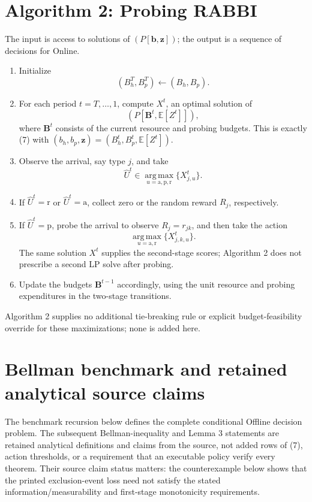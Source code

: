 \documentclass{article}
\begin{document}
\section*{Algorithm 2: Probing RABBI}
The input is access to solutions of $(P[\mathbf b,\mathbf z])$; the output is a sequence of decisions for Online.
\begin{enumerate}
\item Initialize
\[
(B_h^T,B_p^T)\leftarrow(B_h,B_p).
\]
\item For each period $t=T,\ldots,1$, compute $X^t$, an optimal solution of
\[
(P[\mathbf B^t,\mathbb E[Z^t]]),
\]
where $\mathbf B^t$ consists of the current resource and probing budgets. This is exactly (7) with $(b_h,b_p,\mathbf z)=(B_h^t,B_p^t,\mathbb E[Z^t])$.
\item Observe the arrival, say type $j$, and take
\[
\hat U^t\in\operatorname*{arg\,max}_{u=\mathrm a,\mathrm p,\mathrm r}
\{X^t_{j,u}\}.
\]
\item If $\hat U^t=\mathrm r$ or $\hat U^t=\mathrm a$, collect zero or the random reward $R_j$, respectively.
\item If $\hat U^t=\mathrm p$, probe the arrival to observe $R_j=r_{jk}$, and then take the action
\[
\operatorname*{arg\,max}_{u=\mathrm a,\mathrm r}\{X^t_{j,k,u}\}.
\]
The same solution $X^t$ supplies the second-stage scores; Algorithm 2 does not prescribe a second LP solve after probing.
\item Update the budgets $\mathbf B^{t-1}$ accordingly, using the unit resource and probing expenditures in the two-stage transitions.
\end{enumerate}
Algorithm 2 supplies no additional tie-breaking rule or explicit budget-feasibility override for these maximizations; none is added here.

\section*{Bellman benchmark and retained analytical source claims}
The benchmark recursion below defines the complete conditional Offline decision problem. The subsequent Bellman-inequality and Lemma 3 statements are retained analytical definitions and claims from the source, not added rows of (7), action thresholds, or a requirement that an executable policy verify every theorem. Their source claim status matters: the counterexample below shows that the printed exclusion-event loss need not satisfy the stated information/measurability and first-stage monotonicity requirements.
\end{document}
